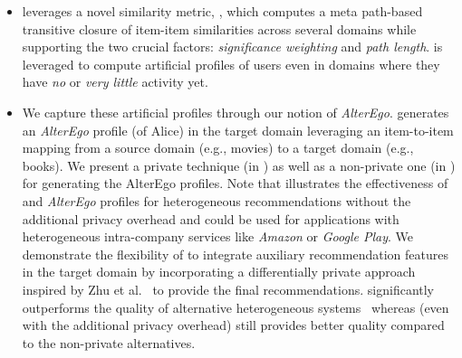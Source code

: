 \begin{itemize}
\item \crossrec leverages a novel similarity metric, \graphsim, which computes a meta path-based transitive closure of item-item similarities across several domains while supporting the two crucial factors: \emph{significance weighting} and \emph{path length}. \graphsim is leveraged to compute artificial profiles of users even in domains where they have \emph{no} or \emph{very little} activity yet. 

\item We capture these artificial profiles through our notion of \emph{AlterEgo}.  \crossrec generates an \emph{AlterEgo} profile (of Alice) in the target domain leveraging an item-to-item mapping from a source domain (e.g., movies) to a target domain (e.g., books). We present a private technique (in \crossrec) as well as a non-private one (in \npcrossrec) for generating the AlterEgo profiles. Note that \npcrossrec illustrates the effectiveness of \graphsim and \emph{AlterEgo} profiles for heterogeneous recommendations without the additional privacy overhead and could be used for applications with heterogeneous intra-company services like \emph{Amazon} or \emph{Google Play}. We demonstrate the flexibility of \crossrec to integrate auxiliary recommendation features in the target domain by incorporating a differentially private approach inspired by Zhu et al.~\cite{zhu2013differential,zhu2014effective} to provide the final recommendations. \npcrossrec significantly outperforms the quality of alternative heterogeneous systems~\cite{baltrunas2009context,lemire2005slope,berkovsky2007cross,sarwar2001item, cremonesi2011cross} whereas \crossrec (even with the additional privacy overhead) still provides better quality compared to the non-private alternatives.



\end{itemize}
